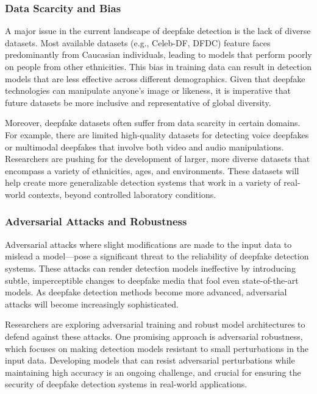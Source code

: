\documentclass[lettersize,journal]{IEEEtran}
\begin{document}
\subsubsection{Data Scarcity and Bias}
A major issue in the current landscape of deepfake detection is the lack of diverse datasets. Most available datasets (e.g., Celeb-DF, DFDC) feature faces predominantly from Caucasian individuals, leading to models that perform poorly on people from other ethnicities. This bias in training data can result in detection models that are less effective across different demographics. Given that deepfake technologies can manipulate anyone’s image or likeness, it is imperative that future datasets be more inclusive and representative of global diversity.

Moreover, deepfake datasets often suffer from data scarcity in certain domains. For example, there are limited high-quality datasets for detecting voice deepfakes or multimodal deepfakes that involve both video and audio manipulations. Researchers are pushing for the development of larger, more diverse datasets that encompass a variety of ethnicities, ages, and environments. These datasets will help create more generalizable detection systems that work in a variety of real-world contexts, beyond controlled laboratory conditions.

\subsubsection{Adversarial Attacks and Robustness}

Adversarial attacks where slight modifications are made to the input data to mislead a model—pose a significant threat to the reliability of deepfake detection systems. These attacks can render detection models ineffective by introducing subtle, imperceptible changes to deepfake media that fool even state-of-the-art models. As deepfake detection methods become more advanced, adversarial attacks will become increasingly sophisticated.

Researchers are exploring adversarial training and robust model architectures to defend against these attacks. One promising approach is adversarial robustness, which focuses on making detection models resistant to small perturbations in the input data. Developing models that can resist adversarial perturbations while maintaining high accuracy is an ongoing challenge, and crucial for ensuring the security of deepfake detection systems in real-world applications.
\end{document}
